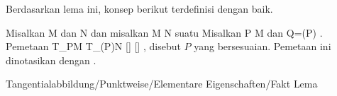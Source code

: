 Berdasarkan lema ini, konsep berikut terdefinisi dengan baik.

{}
{

Misalkan
\mathkor {} {M} {dan} {N} {}
dan misalkan
\maabbdisp {\varphi} { M } { N
} {}
suatu
Misalkan
\mathkor {} {P \in M} {dan} {Q=\varphi(P)} {.}
Pemetaan
\maabbeledisp {} {T_PM} {T_{\varphi(P)}N
} { [\gamma] } { [\varphi \circ \gamma]
} {,}
disebut  $P$ yang bersesuaian. Pemetaan ini dinotasikan dengan
.

}



{Tangentialabbildung/Punktweise/Elementare Eigenschaften/Fakt}
{Lema}
{}
